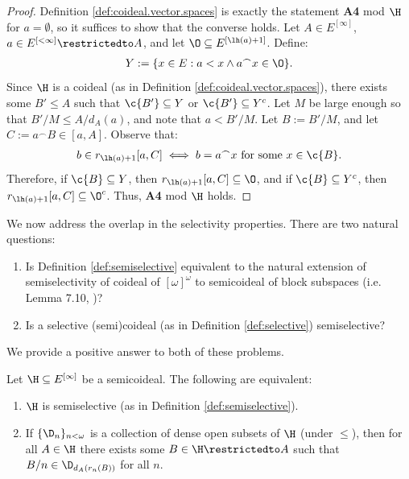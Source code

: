 \documentclass[11pt,reqno]{amsart}
\begin{document}
\begin{proof}
    Definition \ref{def:coideal.vector.spaces} is exactly the statement \textbf{A4} mod $\H$ for $a = \emptyset$, so it suffices to show that the converse holds. Let $A \in E^{[\infty]}$, $a \in E^{[<\infty]}\restrictedto A$, and let $\O \subseteq E^{[\lh(a)+1]}$. Define:
    \begin{align*}
        Y := \{x \in E : a < x \wedge a^\frown x \in \O\}.
    \end{align*}
    Since $\H$ is a coideal (as in Definition \ref{def:coideal.vector.spaces}), there exists some $B' \leq A$ such that $\c{B'} \subseteq Y$ or $\c{B'} \subseteq Y^c$. Let $M$ be large enough so that $B'/M \leq A/d_A(a)$, and note that $a < B'/M$. Let $B := B'/M$, and let $C := a^\frown B \in [a,A]$. Observe that:
    \begin{align*}
        b \in r_{\lh(a)+1}[a,C] \iff b = a^\frown x \text{ for some $x \in \c{B}$}.
    \end{align*}
    Therefore, if $\c{B} \subseteq Y$, then $r_{\lh(a)+1}[a,C] \subseteq \O$, and if $\c{B} \subseteq Y^c$, then $r_{\lh(a)+1}[a,C] \subseteq \O^c$. Thus, \textbf{A4} mod $\H$ holds.
\end{proof}

We now address the overlap in the selectivity properties. There are two natural questions:
\begin{enumerate}
    \item Is Definition \ref{def:semiselective} equivalent to the natural extension of semiselectivity of coideal of $[\omega]^\omega$ to semicoideal of block subspaces (i.e. Lemma 7.10, \cite{T10})?

    \item Is a selective (semi)coideal (as in Definition \ref{def:selective}) semiselective?
\end{enumerate}

We provide a positive answer to both of these problems.

\begin{lemma}
\label{lem:semiselectivity.equivalence}
    Let $\H \subseteq E^{[\infty]}$ be a semicoideal. The following are equivalent:
    \begin{enumerate}
        \item $\H$ is semiselective (as in Definition \ref{def:semiselective}).
        
        \item If $\{\D_n\}_{n<\omega}$ is a collection of dense open subsets of $\H$ (under $\leq$), then for all $A \in \H$ there exists some $B \in \H\restrictedto A$ such that $B/n \in \D_{d_A(r_n(B))}$ for all $n$.
    \end{enumerate}
\end{lemma}
\end{document}
